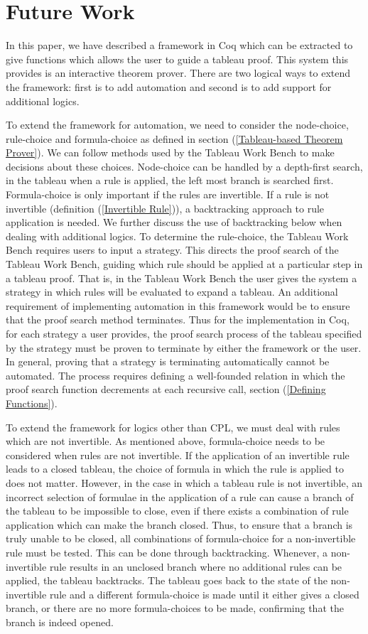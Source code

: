 \documentclass{llncs}
\begin{document}
\section{Future Work}
%
In this paper, we have described a framework in Coq which can be extracted to
give functions which allows the user to guide a tableau proof. This system this
provides is an interactive theorem prover. There are two logical ways to extend
the framework: first is to add automation and second is to add support for
additional logics.

To extend the framework for automation, we need to consider the node-choice,
rule-choice and formula-choice as defined in section (\ref{Tableau-based
Theorem Prover}). We can follow methods used by the Tableau Work Bench
\cite{abate2007tableau} to make decisions about these choices.  Node-choice can
be handled by a depth-first search, in the tableau when a rule is applied, the
left most branch is searched first. Formula-choice is only important if the
rules are invertible. If a rule is not invertible (definition (\ref{Invertible
Rule})), a backtracking approach to rule application is needed. We further
discuss the use of backtracking below when dealing with additional logics. To
determine the rule-choice, the Tableau Work Bench requires users to input a
strategy. This directs the proof search of the Tableau Work Bench, guiding
which rule should be applied at a particular step in a tableau proof. That is,
in the Tableau Work Bench the user gives the system a strategy in which rules
will be evaluated to expand a tableau. An additional requirement of
implementing automation in this framework would be to ensure that the proof
search method terminates. Thus for the implementation in Coq, for each strategy
a user provides, the proof search process of the tableau specified by the
strategy must be proven to terminate by either the framework or the user. In
general, proving that a strategy is terminating automatically cannot be
automated. The process requires defining a well-founded relation in which the
proof search function decrements at each recursive call, section (\ref{Defining
Functions}).

To extend the framework for logics other than CPL, we must deal with rules
which are not invertible. As mentioned above, formula-choice needs to be
considered when rules are not invertible. If the application of an invertible
rule leads to a closed tableau, the choice of formula in which the rule is
applied to does not matter. However, in the case in which a tableau rule is not
invertible, an incorrect selection of formulae in the application of a rule can
cause a branch of the tableau to be impossible to close, even if there exists a
combination of rule application which can make the branch closed. Thus, to
ensure that a branch is truly unable to be closed, all combinations of
formula-choice for a non-invertible rule must be tested. This can be done
through backtracking. Whenever, a non-invertible rule results in an unclosed
branch where no additional rules can be applied, the tableau backtracks. The
tableau goes back to the state of the non-invertible rule and a different
formula-choice is made until it either gives a closed branch, or there are no
more formula-choices to be made, confirming that the branch is indeed opened.
%
\end{document}
